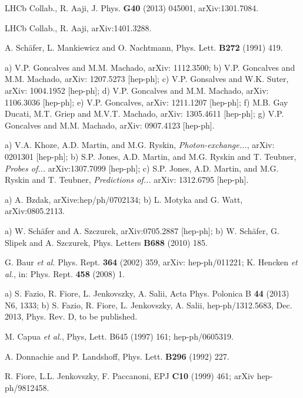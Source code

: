 \documentclass[12pt]{article}
\begin{document}
\begin{thebibliography}{99}
 LHCb Collab., R. Aaji, J. Phys. {\bf G40} (2013) 045001, arXiv:1301.7084.

  LHCb Collab., R. Aaji, arXiv:1401.3288.

 A. Sch\"afer, L. Mankiewicz and O. Nachtmann, Phys. Lett. {\bf B272} (1991) 419.

 a) V.P. Goncalves and M.M. Machado, arXiv: 1112.3500;
b) V.P. Goncalves and M.M. Machado, arXiv: 1207.5273 [hep-ph]; c) V.P. Gonsalves and W.K. Suter, arXiv: 1004.1952 [hep-ph];
d) V.P. Goncalves and M.M. Machado, arXiv: 1106.3036 [hep-ph]; e) V.P. Goncalves,
arXiv: 1211.1207 [hep-ph]; f) M.B. Gay Ducati, M.T. Griep and M.V.T. Machado, arXiv: 1305.4611 [hep-ph];
g) V.P. Goncalves and M.M. Machado, arXiv: 0907.4123 [hep-ph].

 a) V.A. Khoze, A.D. Martin, and M.G. Ryskin, {\it Photon-exchange...}, arXiv: 0201301 [hep-ph];
b) S.P. Jones, A.D. Martin, and M.G. Ryskin and T. Teubner, {\it Probes of...} arXiv:1307.7099 [hep-ph];
c) S.P. Jones, A.D. Martin, and M.G. Ryskin and T. Teubner, {\it Predictions of...} arXiv: 1312.6795 [hep-ph].

 a) A. Bzdak, arXive:hep/ph/0702134; b) L. Motyka and G. Watt, arXiv:0805.2113.

 a) W. Sch\"afer and A. Szczurek, arXiv:0705.2887 [hep-ph]; b) W. Sch\"afer, G. Slipek and A. Szczurek,
Phys. Letters {\bf B688} (2010) 185.


 G. Baur {\it et al.} Phys. Rept. {\bf 364} (2002) 359, arXiv: hep-ph/011221; K. Hencken {\it et al.}, in: Phys. Rept. {\bf 458} (2008) 1.

 a) S. Fazio, R. Fiore, L. Jenkovszky, A. Salii, Acta Phys. Polonica B {\bf 44} (2013) N6, 1333; b) S. Fazio, R. Fiore, L. Jenkovszky, A. Salii,
hep-ph/1312.5683, Dec. 2013, Phys. Rev. D, to be published. 

 M. Capua {\it et al.}, Phys, Lett. {B645} (1997) 161; hep-ph/0605319.



 A. Donnachie and P. Landshoff, Phys. Lett. {\bf B296} (1992) 227.

 R. Fiore, L.L. Jenkovszky, F. Paccanoni, EPJ {\bf C10} (1999) 461; arXiv hep-ph/9812458.




\end{thebibliography}
\end{document}
